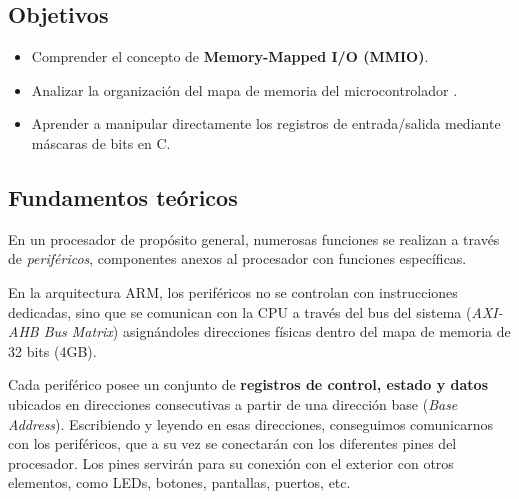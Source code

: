 \documentclass[../main.tex]{subfiles}
\begin{document}

    \subsection{Objetivos}
        \begin{itemize}
            \item Comprender el concepto de \textbf{Memory-Mapped I/O (MMIO)}.
            \item Analizar la organización del mapa de memoria del microcontrolador \MCU.
            \item Aprender a manipular directamente los registros de entrada/salida mediante máscaras de bits en C.
        \end{itemize}

    \subsection{Fundamentos teóricos}
        En un procesador de propósito general, numerosas funciones se realizan a través de \textit{periféricos}, componentes anexos al procesador con funciones específicas. 

        En la arquitectura ARM, los periféricos no se controlan con instrucciones dedicadas, sino que se comunican con la CPU a través del bus del sistema (\textit{AXI-AHB Bus Matrix}) asignándoles direcciones físicas dentro del mapa de memoria de 32 bits (4GB).
    
        Cada periférico posee un conjunto de \textbf{registros de control, estado y datos} ubicados en direcciones consecutivas a partir de una dirección base (\textit{Base Address}). Escribiendo y leyendo en esas direcciones, conseguimos comunicarnos con los periféricos, que a su vez se conectarán con los diferentes pines del procesador. Los pines servirán para su conexión con el exterior con otros elementos, como LEDs, botones, pantallas, puertos, etc.
\end{document}

